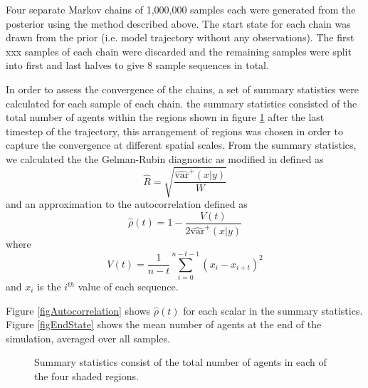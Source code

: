 \documentclass{article}
\begin{document}
Four separate Markov chains of 1,000,000 samples each were generated from the posterior using the method described above. The start state for each chain was drawn from the prior (i.e. model trajectory without any observations).  The first xxx samples of each chain were discarded and the remaining samples were split into first and last halves to give 8 sample sequences in total.

In order to assess the convergence of the chains, a set of summary statistics were calculated for each sample of each chain.  the summary statistics consisted of the total number of agents within the regions shown in figure \ref{figRegions} after the last timestep of the trajectory, this arrangement of regions was chosen in order to capture the convergence at different spatial scales. From the summary statistics, we calculated the the Gelman-Rubin diagnostic \cite{gelman1992inference} as modified in \cite{gelman2013bayesian} defined as
\[
\hat{R} = \sqrt{\frac{\widehat{\text{var}}^+(x|y)}{W}}
\]
and an approximation to the autocorrelation defined as
\[
\hat{\rho}(t) = 1 - \frac{V(t)}{2\widehat{\text{var}}^+(x|y)}
\]
where
\[
V(t) = \frac{1}{n-t} \sum_{i=0}^{n-t-1} (x_i - x_{i+t})^2
\]
and $x_i$ is the $i^{th}$ value of each sequence.

Figure \ref{figAutocorrelation} shows $\hat{\rho}(t)$ for each scalar in the summary statistics. Figure \ref{figEndState} shows the mean number of agents at the end of the simulation, averaged over all samples.

\begin{figure}
	\centering
	\caption{Summary statistics consist of the total number of agents in each of the four shaded regions.}
	\label{figRegions}
\end{figure}
\end{document}
